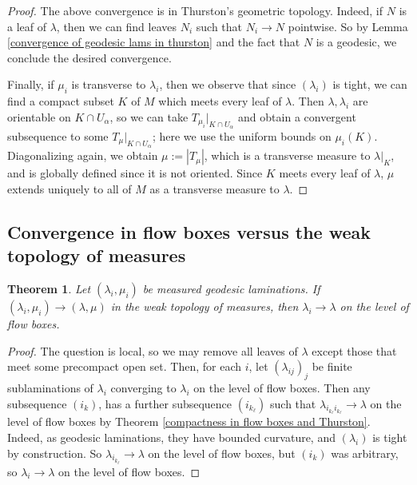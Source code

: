 \documentclass[reqno,11pt]{amsart}
\DeclareMathOperator{\supp}{supp}
\newcommand{\normal}{\mathbf n}
\newtheorem{theorem}{Theorem}[section]
\newtheorem{lemma}[theorem]{Lemma}
\theoremstyle{definition}
\numberwithin{equation}{section}
\begin{document}
\begin{proof}
The above convergence is in Thurston's geometric topology.
Indeed, if $N$ is a leaf of $\lambda$, then we can find leaves $N_i$ such that $N_i \to N$ pointwise.
So by Lemma \ref{convergence of geodesic lams in thurston} and the fact that $N$ is a geodesic, we conclude the desired convergence.

Finally, if $\mu_i$ is transverse to $\lambda_i$, then we observe that since $(\lambda_i)$ is tight, we can find a compact subset $K$ of $M$ which meets every leaf of $\lambda$.
Then $\lambda, \lambda_i$ are orientable on $K \cap U_\alpha$, so we can take $T_{\mu_i}|_{K \cap U_\alpha}$ and obtain a convergent subsequence to some $T_\mu|_{K \cap U_\alpha}$; here we use the uniform bounds on $\mu_i(K)$.
Diagonalizing again, we obtain $\mu := |T_\mu|$, which is a transverse measure to $\lambda|_K$, and is globally defined since it is not oriented.
Since $K$ meets every leaf of $\lambda$, $\mu$ extends uniquely to all of $M$ as a transverse measure to $\lambda$.
\end{proof}

\subsection{Convergence in flow boxes versus the weak topology of measures}
\begin{theorem}\label{measures implies flow boxes}
Let $(\lambda_i, \mu_i)$ be measured geodesic laminations.
If $(\lambda_i, \mu_i) \to (\lambda, \mu)$ in the weak topology of measures, then $\lambda_i \to \lambda$ on the level of flow boxes.
\end{theorem}
\begin{proof}
The question is local, so we may remove all leaves of $\lambda$ except those that meet some precompact open set.
Then, for each $i$, let $(\lambda_{ij})_j$ be finite sublaminations of $\lambda_i$ converging to $\lambda_i$ on the level of flow boxes.
Then any subsequence $(i_k)$, has a further subsequence $(i_{k_\ell})$ such that $\lambda_{i_{k_\ell} i_{k_\ell}} \to \lambda$ on the level of flow boxes by Theorem \ref{compactness in flow boxes and Thurston}.
Indeed, as geodesic laminations, they have bounded curvature, and $(\lambda_i)$ is tight by construction.
So $\lambda_{i_{k_\ell}} \to \lambda$ on the level of flow boxes, but $(i_k)$ was arbitrary, so $\lambda_i \to \lambda$ on the level of flow boxes.
\end{proof}

\end{document}
